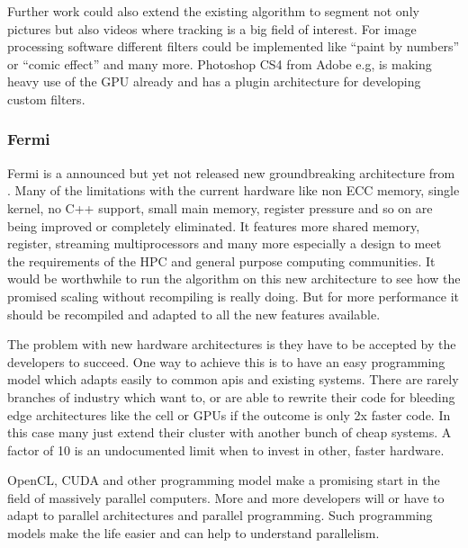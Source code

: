 Further work could also extend the existing algorithm to segment not only pictures 
but also videos where tracking is a big field of interest. For image processing
software different filters could be implemented like ``paint by numbers'' or 
``comic effect'' and many more. Photoshop \gls{CS4} from Adobe e.g, is making heavy
use of the \gls{GPU} already and has a plugin architecture for developing custom
filters.  
 
\subsubsection{Fermi} %
\label{ssub:fermi}
Fermi is a announced but yet not released new groundbreaking architecture from
{}. Many of the limitations with the current hardware like 
non \gls{ECC} memory, single kernel, no C++ support, small main memory, register
pressure and so on are being improved or completely eliminated. It features more
shared memory, register, streaming multiprocessors and many more especially
a design to meet the requirements of the \gls{HPC} and general purpose computing
communities. It would be worthwhile to run the algorithm on this new architecture
to see how the promised scaling without recompiling is really doing. But for more
performance it should be recompiled and adapted to all the new features available.

The problem with new hardware architectures is they have to be accepted by the
developers to succeed. One way to achieve this is to have an easy programming
model which adapts easily to common apis and existing systems. There are rarely
branches of industry which want to, or are able to rewrite their code for
bleeding edge architectures like the cell or \glspl{GPU} if the outcome is only
2x faster code. In this case many just extend their cluster with another bunch
of cheap systems. A factor of 10 is an undocumented limit when to invest in
other, faster hardware.

OpenCL, \gls{CUDA} and other programming model make a promising start in the field
of massively parallel computers. More and more developers will or have to adapt to
parallel architectures and parallel programming. Such programming models make 
the life easier and can help to understand parallelism.





